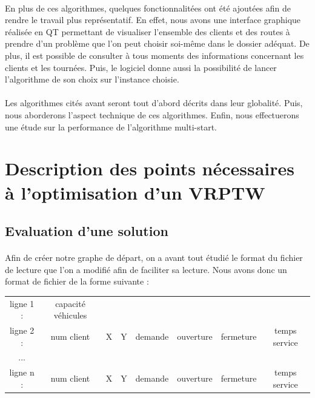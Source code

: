 \documentclass[12pt]{article}
\begin{document}
\paragraph{}
En plus de ces algorithmes, quelques fonctionnalitées ont été ajoutées afin de rendre le travail plus représentatif. En effet, nous avons une interface 
graphique réalisée en QT permettant de visualiser l'ensemble des clients et des routes à prendre d'un problème que l'on peut choisir soi-même dans le
dossier adéquat. De plus, il est possible de consulter à tous moments des informations concernant les clients et les tournées. Puis, le logiciel donne 
aussi la possibilité de lancer l'algorithme de son choix sur l'instance choisie.

\paragraph{}
Les algorithmes cités avant seront tout d'abord décrits dans leur globalité. Puis, nous aborderons l'aspect technique de ces algorithmes. Enfin, 
nous effectuerons une étude sur la performance de l'algorithme multi-start.

\clearpage
\section{Description des points nécessaires à l’optimisation d’un VRPTW}

\subsection{Evaluation d'une solution}

\paragraph{}
Afin de créer notre graphe de départ, on a avant tout étudié le format du fichier de lecture que l'on a modifié afin de faciliter 
sa lecture. Nous avons donc un format de fichier de la forme suivante : \\

\begin{tabular}{ *{8}{c} }
   ligne 1 : & capacité véhicules &  & & & & &\\
   ligne 2 : & num client & X & Y & demande & ouverture & fermeture & temps service \\
   ... & & & & & & & \\
   ligne n : & num client & X & Y & demande & ouverture & fermeture & temps service \\
 \end{tabular}
\end{document}
